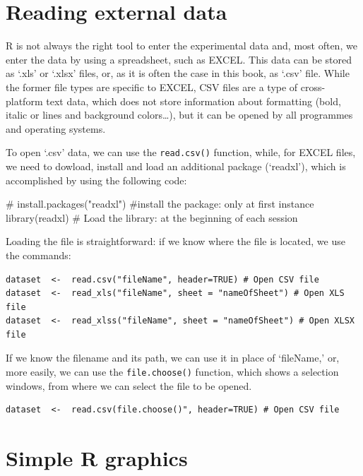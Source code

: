 \documentclass[a4paper,12pt,oneside]{book}
\newenvironment{Shaded}{\begin{snugshade}}{\end{snugshade}}
\newcommand{\CommentTok}[1]{#1}
\newcommand{\FunctionTok}[1]{#1}
\newcommand{\NormalTok}[1]{#1}
\begin{document}
\hypertarget{reading-external-data}{%
\section{Reading external data}\label{reading-external-data}}

R is not always the right tool to enter the experimental data and, most often, we enter the data by using a spreadsheet, such as EXCEL. This data can be stored as `.xls' or `.xlsx' files, or, as it is often the case in this book, as `.csv' file. While the former file types are specific to EXCEL, CSV files are a type of cross-platform text data, which does not store information about formatting (bold, italic or lines and background colors\ldots), but it can be opened by all programmes and operating systems.

To open `.csv' data, we can use the \texttt{read.csv()} function, while, for EXCEL files, we need to dowload, install and load an additional package (`readxl'), which is accomplished by using the following code:

\begin{Shaded}
\begin{Highlighting}[]
\CommentTok{\# install.packages("readxl") \#install the package: only at first instance}
\FunctionTok{library}\NormalTok{(readxl) }\CommentTok{\# Load the library: at the beginning of each session}
\end{Highlighting}
\end{Shaded}

Loading the file is straightforward: if we know where the file is located, we use the commands:

\begin{verbatim}
dataset  <-  read.csv("fileName", header=TRUE) # Open CSV file
dataset  <-  read_xls("fileName", sheet = "nameOfSheet") # Open XLS file
dataset  <-  read_xlss("fileName", sheet = "nameOfSheet") # Open XLSX file
\end{verbatim}

If we know the filename and its path, we can use it in place of `fileName,' or, more easily, we can use the \texttt{file.choose()} function, which shows a selection windows, from where we can select the file to be opened.

\begin{verbatim}
dataset  <-  read.csv(file.choose()", header=TRUE) # Open CSV file
\end{verbatim}

\hypertarget{simple-r-graphics}{%
\section{Simple R graphics}\label{simple-r-graphics}}
\end{document}
